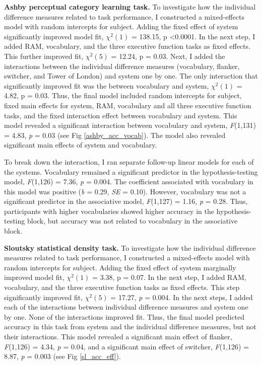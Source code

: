 \documentclass[../dissertation.tex]{subfiles}
\begin{document}
\textbf{Ashby perceptual category learning task.} To investigate how the individual difference measures related to task performance, I constructed a mixed-effects model with random intercepts for subject. Adding the fixed effect of system significantly improved model fit,  $\chi^{2}(1)$ = 138.15, p \textless 0.0001. In the next step, I added RAM, vocabulary, and the three executive function tasks as fixed effects. This further improved fit, $\chi^{2}(5)$ = 12.24, p = 0.03. Next, I added the interactions between the individual difference measures (vocabulary, flanker, switcher, and Tower of London) and system one by one. The only interaction that significantly improved fit was the between vocabulary and system, $\chi^{2}(1)$ = 4.82, p = 0.03. Thus, the final model included random intercepts for subject, fixed main effects for system, RAM, vocabulary and all three executive function tasks, and the fixed interaction effect between vocabulary and system. This model revealed a significant interaction between vocabulary and system, \textit{F}(1,131) = 4.83, \textit{p} = 0.03 (see Fig \ref{ashby_acc_vocab}). The model also revealed significant main effects of system and vocabulary. \par 
	To break down the interaction, I ran separate follow-up linear models for each of the systems. Vocabulary remained a significant predictor in the hypothesis-testing model, \textit{F}(1,126) = 7.36, \textit{p} = 0.004. The coefficient associated with vocabulary in this model was positive (\textit{b} = 0.29, \textit{SE} = 0.10). However, vocabulary was not a significant predictor in the associative model, \textit{F}(1,127) = 1.16, \textit{p} = 0.28. Thus, participants with higher vocabularies showed higher accuracy in the hypothesis-testing block, but accuracy was not related to vocabulary in the associative block. \par	
	\textbf{Sloutsky statistical density task.}  To investigate how the individual difference measures related to task performance, I constructed a mixed-effects model with random intercepts for subject. Adding the fixed effect of system marginally improved model fit,  $\chi^{2}(1)$ = 3.38, p = 0.07. In the next step, I added RAM, vocabulary, and the three executive function tasks as fixed effects. This step significantly improved fit, $\chi^{2}(5)$  = 17.27, \textit{p} = 0.004. In the next steps, I added each of the interactions between individual difference measures and system one by one. None of the interactions improved fit. Thus, the final model predicted accuracy in this task from system and the individual difference measures, but not their interactions. This model revealed a significant main effect of flanker, \textit{F}(1,126) = 4.34, \textit{p} = 0.04, and a significant main effect of switcher, \textit{F}(1,126) = 8.87, \textit{p} = 0.003 (see Fig \ref{sl_acc_eff}). 	
\end{document}
